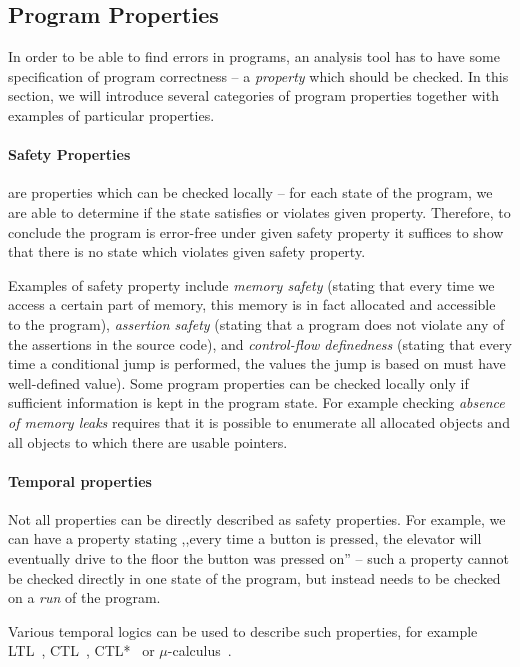 \subsection{Program Properties}

In order to be able to find errors in programs, an analysis tool has to have
some specification of program correctness -- a \emph{property} which should be
checked.
In this section, we will introduce several categories of program properties
together with examples of particular properties.

\paragraph{Safety Properties}
%
are properties which can be checked locally -- for
each state of the program, we are able to determine if the state satisfies or
violates given property.
Therefore, to conclude the program is error-free under given safety property it
suffices to show that there is no state which violates given safety property.

Examples of safety property include \emph{memory safety} (stating that every
time we access a certain part of memory, this memory is in fact allocated and
accessible to the program), \emph{assertion safety} (stating that a program
does not violate any of the assertions in the source code), and
\emph{control-flow definedness} (stating that every time a conditional jump is
performed, the values the jump is based on must have well-defined value).
Some program properties can be checked locally only if sufficient information
is kept in the program state.
For example checking \emph{absence of memory leaks} requires that it is
possible to enumerate all allocated objects and all objects to which there are
usable pointers.

\paragraph{Temporal properties}
%
Not all properties can be directly described as safety properties.
For example, we can have a property stating ,,every time a button is pressed, the elevator will eventually drive to the floor the button was pressed on'' -- such a property cannot be checked directly in one state of the program, but instead needs to be checked on a \emph{run} of the program.

Various temporal logics can be used to describe such properties, for example
LTL~\cite{todo}, CTL~\cite{todo}, CTL*~\cite{todo} or
$\mu$-calculus~\cite{todo}.

